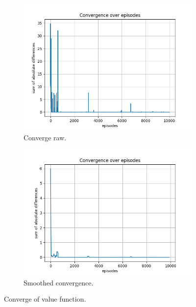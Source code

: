 \documentclass{assignment}
\begin{document}
\begin{figure}[H]
    \begin{subfigure}{0.5\textwidth}
        \includegraphics[width=\textwidth]{figures/convergence_td/gamma_sweep/convergence_TD_alpha_0.1_gamma_0.5_epislon_0.2.png}
    \caption{Converge raw.}
    \end{subfigure}\hfill
    \begin{subfigure}{0.5\textwidth}
        \includegraphics[width=\textwidth]{figures/convergence_td/gamma_sweep/convergence_TD_smoothed_alpha_0.1_gamma_0.5_epislon_0.2.png}
    \caption{Smoothed convergence.}
    \end{subfigure}
    \caption{Converge of value function.}
    \label{fig:gamma_0.5_td_learning_convergence}
\end{figure}
\end{document}
